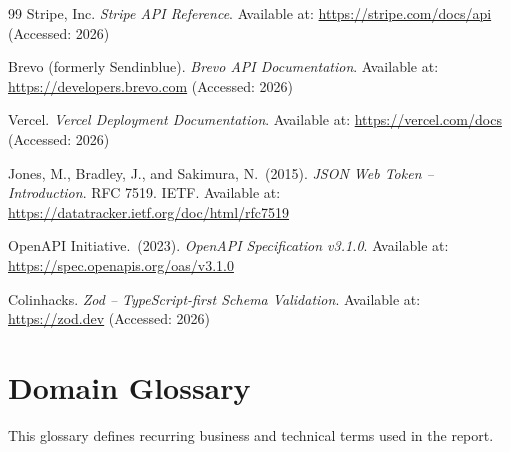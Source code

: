 \documentclass[12pt,a4paper]{report}
\begin{document}
\begin{thebibliography}{99}
    Stripe, Inc.
    \textit{Stripe API Reference}.
    Available at: \url{https://stripe.com/docs/api}
    (Accessed: 2026)

    Brevo (formerly Sendinblue).
    \textit{Brevo API Documentation}.
    Available at: \url{https://developers.brevo.com}
    (Accessed: 2026)

    Vercel.
    \textit{Vercel Deployment Documentation}.
    Available at: \url{https://vercel.com/docs}
    (Accessed: 2026)

    Jones, M., Bradley, J., and Sakimura, N.\ (2015).
    \textit{JSON Web Token -- Introduction}.
    RFC 7519. IETF.
    Available at: \url{https://datatracker.ietf.org/doc/html/rfc7519}

    OpenAPI Initiative.\ (2023).
    \textit{OpenAPI Specification v3.1.0}.
    Available at: \url{https://spec.openapis.org/oas/v3.1.0}

    Colinhacks.
    \textit{Zod -- TypeScript-first Schema Validation}.
    Available at: \url{https://zod.dev}
    (Accessed: 2026)

\end{thebibliography}

\appendix

\chapter{Domain Glossary}
\label{app:glossary}

This glossary defines recurring business and technical terms used in the report.
\end{document}
